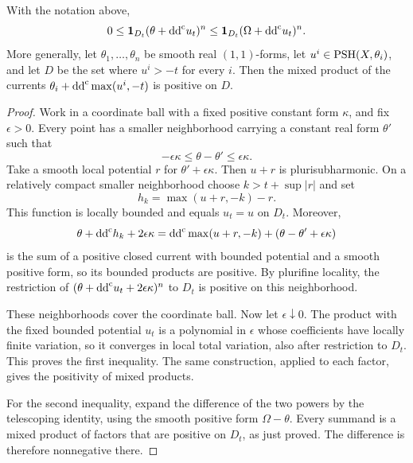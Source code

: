 \begin{lemma}\label{lem:restricted-positive-product}
With the notation above,
\[
 0\leq\mathbf1_{D_t}(\theta+\mathrm{dd}^{\mathrm{c}} u_t)^n
 \leq\mathbf1_{D_t}(\Omega+\mathrm{dd}^{\mathrm{c}} u_t)^n.
\]
More generally, let $\theta_1,\ldots,\theta_n$ be smooth real $(1,1)$-forms, let $u^i\in\mathrm{PSH}(X,\theta_i)$, and let $D$ be the set where $u^i>-t$ for every $i$. Then the mixed product of the currents $\theta_i+\mathrm{dd}^{\mathrm{c}}\max(u^i,-t)$ is positive on $D$.
\end{lemma}
\begin{proof}
Work in a coordinate ball with a fixed positive constant form $\kappa$, and fix $\epsilon>0$. Every point has a smaller neighborhood carrying a constant real form $\theta'$ such that
\[
 -\epsilon\kappa\leq\theta-\theta'\leq\epsilon\kappa.
\]
Take a smooth local potential $r$ for $\theta'+\epsilon\kappa$. Then $u+r$ is plurisubharmonic. On a relatively compact smaller neighborhood choose $k>t+\sup|r|$ and set
\[
 h_k=\max(u+r,-k)-r.
\]
This function is locally bounded and equals $u_t=u$ on $D_t$. Moreover,
\[
 \theta+\mathrm{dd}^{\mathrm{c}} h_k+2\epsilon\kappa
 =\mathrm{dd}^{\mathrm{c}}\max(u+r,-k)+(\theta-\theta'+\epsilon\kappa)
\]
is the sum of a positive closed current with bounded potential and a smooth positive form, so its bounded products are positive. By plurifine locality, the restriction of $(\theta+\mathrm{dd}^{\mathrm{c}} u_t+2\epsilon\kappa)^n$ to $D_t$ is positive on this neighborhood.

These neighborhoods cover the coordinate ball. Now let $\epsilon\downarrow0$. The product with the fixed bounded potential $u_t$ is a polynomial in $\epsilon$ whose coefficients have locally finite variation, so it converges in local total variation, also after restriction to $D_t$. This proves the first inequality. The same construction, applied to each factor, gives the positivity of mixed products.

For the second inequality, expand the difference of the two powers by the telescoping identity, using the smooth positive form $\Omega-\theta$. Every summand is a mixed product of factors that are positive on $D_t$, as just proved. The difference is therefore nonnegative there.
\end{proof}

